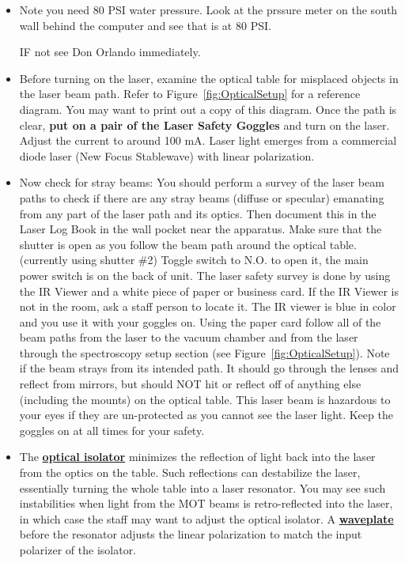 \documentclass{../lab}
\begin{document}
\begin{itemize}
    \item Note you need 80 PSI water pressure. Look at the prssure meter on the south wall behind the computer and see that is at 80 PSI.
    
    IF not see Don Orlando immediately.

    \item Before turning on the laser, examine the optical table for misplaced objects in the laser beam path. Refer to Figure~\ref{fig:OpticalSetup} for a reference diagram. You may want to print out a copy of this diagram. Once the path is clear, \textbf{put on a pair of the Laser Safety Goggles} and turn on the laser. Adjust the current to around 100 mA. Laser light emerges from a commercial diode laser (New Focus Stablewave) with linear polarization.

    \item Now check for stray beams: You should perform a survey of the laser beam paths to check if there are any stray beams (diffuse or specular) emanating from any part of the laser path and its optics. Then document this in the Laser Log Book in the wall pocket near the apparatus. Make sure that the shutter is open as you follow the beam path around the optical table. (currently using shutter \#2) Toggle switch to N.O. to open it, the main power switch is on the back of unit. The laser safety survey is done by using the IR Viewer and a white piece of paper or business card. If the IR Viewer is not in the room, ask a staff person to locate it. The IR viewer is blue in color and you use it with your goggles on. Using the paper card follow all of the beam paths from the laser to the vacuum chamber and from the laser through the spectroscopy setup section (see Figure~\ref{fig:OpticalSetup}). Note if the beam strays from its intended path. It should go through the lenses and reflect from mirrors, but should NOT hit or reflect off of anything else (including the mounts) on the optical table. This laser beam is hazardous to your eyes if they are un-protected as you cannot see the laser light. Keep the goggles on at all times for your safety.

    \item The \href{http://en.wikipedia.org/wiki/Optical\_isolator}{\textbf{optical isolator}} minimizes the reflection of light back into the laser from the optics on the table. Such reflections can destabilize the laser, essentially turning the whole table into a laser resonator. You may see such instabilities when light from the MOT beams is retro-reflected into the laser, in which case the staff may want to adjust the optical isolator. A \href{http://en.wikipedia.org/wiki/Wave\_plate}{\textbf{waveplate}} before the resonator adjusts the linear polarization to match the input polarizer of the isolator.


\end{itemize}
\end{document}
